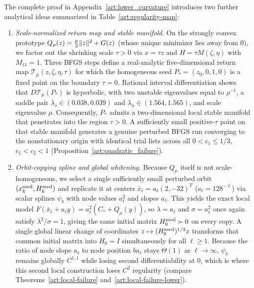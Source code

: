 The complete proof in Appendix~\ref{art:lower_curvature} introduces two further
analytical ideas summarized in Table~\ref{art:regularity-map}:
\begin{enumerate}
\item \emph{Scale-normalized return map and stable manifold.} On the strongly
convex prototype $Q_\mu(z)=\tfrac\mu2\lVert z\rVert^2+G(z)$ (whose unique minimizer
 lies away from $0$), we factor out the shrinking scale $\tau>0$ via $x=\tau z$
and $H=\tau M(\zeta,\eta)$ with $M_{11}=1$. Three BFGS steps define a real-analytic
five-dimensional return map $\mathcal T_\mu(z,\zeta,\eta,\tau)$ for which the
homogeneous seed $P_*=(z_0,0,1,0)$ is a fixed point on the boundary $\tau=0$.
Rational interval differentiation shows that $D\mathcal T_\mu(P_*)$ is
hyperbolic, with two unstable eigenvalues equal to $\rho^{-1}$, a saddle pair
$\lambda_s\in(0.038,0.039)$ and $\lambda_u\in(1.564,1.565)$, and scale
eigenvalue $\rho$. Consequently, $P_*$ admits a two-dimensional local stable
manifold that penetrates into the region $\tau>0$. A sufficiently small
positive-$\tau$ point on that stable manifold generates a genuine
perturbed BFGS run converging to the nonstationary origin with identical trial
lists across all $0<c_1\le1/3$, $c_1<c_2<1$ (Proposition~\ref{art:quadratic_failure}).
\item \emph{Orbit-copying spline and global whitening.} Because $Q_\mu$ itself
is not scale-homogeneous, we select a single sufficiently small perturbed
orbit $(x_k^{\rm seed},H_k^{\rm seed})$ and replicate it at centers
$\bar x_\ell=a_\ell(2,-32)^T$ ($a_\ell=128^{-\ell}$) via scalar splines $\psi_b$
with node values $a_\ell^2$ and slopes $a_\ell$. This yields the exact local
model $F(\bar x_\ell+a_\ell y)=a_\ell^2(C_*+Q_\mu(y))$, so $\lambda=a_\ell$ and
$\sigma=a_\ell^2$ once again satisfy $\lambda^2/\sigma=1$, giving the same
initial matrix $H_0^{\rm seed}\succ0$ on every copy. A single global linear
change of coordinates $z\mapsto(H_0^{\rm seed})^{1/2}z$ transforms that common
initial matrix into $H_0=I$ simultaneously for all $\ell\ge1$. Because the ratio
of node slope $a_\ell$ to node position $ba_\ell$ stays $\Theta(1)$ as
$\ell\to\infty$, $\psi_b$ remains globally $C^{1,1}$ while losing second differentiability at
$0$, which is where this second local construction loses $C^2$ regularity
(compare Theorems~\ref{art:local-failure} and~\ref{art:local-failure-lower}).
\end{enumerate}

